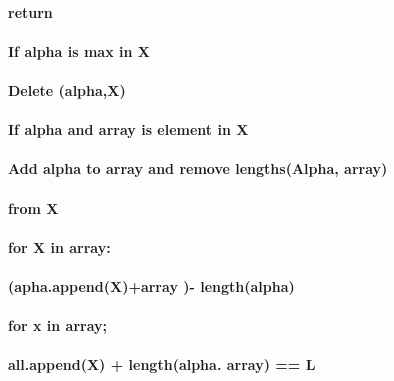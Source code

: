 \documentclass[11pt]{article}
\begin{document}
\paragraph{return}\label{return}

\paragraph{If alpha is max in X}\label{if-alpha-is-max-in-x}

\paragraph{Delete (alpha,X)}\label{delete-alphax}

\paragraph{If alpha and array is element in
X}\label{if-alpha-and-array-is-element-in-x}

\paragraph{Add alpha to array and remove lengths(Alpha,
array)}\label{add-alpha-to-array-and-remove-lengthsalpha-array}

\paragraph{from X}\label{from-x}

\paragraph{for X in array:}\label{for-x-in-array}

\paragraph{(apha.append(X)+array )-
length(alpha)}\label{apha.appendxarray---lengthalpha}

\paragraph{for x in array;}\label{for-x-in-array-1}

\paragraph{all.append(X) + length(alpha. array) ==
L}\label{all.appendx-lengthalpha.-array-l}
\end{document}
